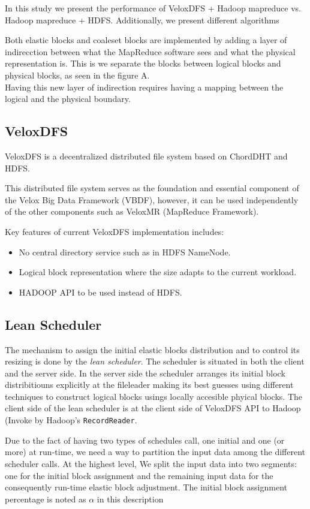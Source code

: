 In this study we present the performance of VeloxDFS + Hadoop mapreduce vs. Hadoop mapreduce + HDFS. Additionally, we present different algorithms 

Both elastic blocks and coaleset blocks are implemented by adding a layer of indirecction between what the MapReduce software sees and what the physical representation is. This is we separate the blocks between logical blocks and physical blocks, as seen in the figure A. \\
Having this new layer of indirection requires having a mapping between the logical and the physical boundary. 

\subsection{VeloxDFS}
VeloxDFS is a decentralized distributed file system based on ChordDHT and HDFS.

This distributed file system serves as the foundation and essential component of the Velox Big Data Framework (VBDF), however, it can be used independently of the other components such as VeloxMR (MapReduce Framework).

Key features of current VeloxDFS implementation includes:
\begin{itemize}
\item No central directory service such as in HDFS NameNode.
\item Logical block representation where the size adapts to the current workload.
\item HADOOP API to be used instead of HDFS.
\end{itemize}

\subsection{Lean Scheduler}
The mechanism to assign the initial elastic blocks distribution and to control its resizing is done by the \textit{lean scheduler}. The scheduler is situated in both the client and the server side. In the server side the scheduler arranges its initial block distribitiouns explicitly at the fileleader making its best guesses using different techniques to construct logical blocks usings locally accesible phyical blocks. The client side of the lean scheduler is at the client side of VeloxDFS API to Hadoop (Invoke by Hadoop's \texttt{RecordReader}.

Due to the fact of having two types of schedules call, one initial and one (or more) at run-time, we need a way to partition the input data 
among the different scheduler calls. At the highest level, We split the input data into two segments: one for the initial block assignment and the remaining input data for the consequently run-time elastic block adjustment. The initial block assignment percentage is noted as $\alpha$ in this description


